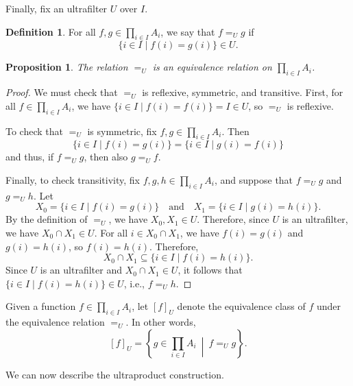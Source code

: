 \documentclass[a4paper]{memoir}
\newtheorem{proposition}[theorem]{Proposition}
\theoremstyle{definition}
\newtheorem{definition}[theorem]{Definition}
\begin{document}
Finally, fix an ultrafilter $U$ over $I$.

\begin{definition}
  For all $f,g \in \prod_{i \in I} A_i$, we say that $f =_U g$ if
  \[
    \{i \in I \mid f(i) = g(i)\} \in U.
  \]
\end{definition}

\begin{proposition}
  The relation $=_U$ is an equivalence relation on $\prod_{i \in I} A_i$.
\end{proposition}

\begin{proof}
  We must check that $=_U$ is reflexive, symmetric, and transitive. First, for all $f \in 
  \prod_{i \in I} A_i$, we have $\{i \in I \mid f(i) = f(i)\} = I \in U$, so $=_U$ is 
  reflexive. 
  
  To check that $=_U$ is symmetric, fix $f,g \in \prod_{i \in I} A_i$. Then 
  \[
    \{i \in I \mid f(i) = g(i)\} = \{i \in I \mid g(i) = f(i)\}
  \]
  and thus, if $f =_U g$, then also $g =_U f$.
  
  Finally, to check transitivity, fix $f,g,h \in \prod_{i \in I} A_i$, and suppose that 
  $f =_U g$ and $g =_U h$. Let 
  \[
    X_0 = \{i \in I \mid f(i) = g(i)\} \ \ \ \text{ and } \ \ \ X_1 = \{i \in I \mid g(i) = h(i)\}.
  \]
  By the definition of $=_U$, we have $X_0, X_1 \in U$. Therefore, since $U$ is an ultrafilter, 
  we have $X_0 \cap X_1 \in U$. 
  For all $i \in X_0 \cap X_1$, we have $f(i) = g(i)$ and $g(i) = h(i)$, so $f(i) = h(i)$. 
  Therefore, 
  \[
    X_0 \cap X_1 \subseteq \{i \in I \mid f(i) = h(i)\}.
  \]
  Since $U$ is an ultrafilter and $X_0 \cap X_1 \in U$, it follows that $\{i \in I \mid 
  f(i) = h(i)\} \in U$, i.e., $f =_U h$.
\end{proof}

Given a function $f \in \prod_{i \in I} A_i$, let $[f]_U$ denote the equivalence class of 
$f$ under the equivalence relation $=_U$. In other words, 
\[
  [f]_U = \left\{g \in \prod_{i \in I} A_i \ \middle| \ f =_U g\right\}.
\]

We can now describe the ultraproduct construction.
\end{document}
